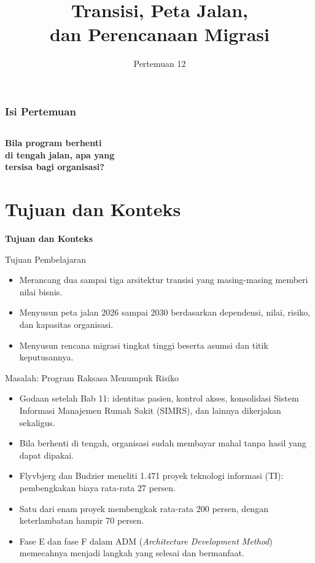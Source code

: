 \documentclass[aspectratio=169, table, 12pt]{beamer}
\title{\Huge Transisi, Peta Jalan,\\ \vspace{10pt} dan Perencanaan Migrasi}
\date{Pertemuan 12}
\begin{document}
\frame{\titlepage}

\begin{frame}
  \frametitle{Isi Pertemuan}
  \vspace{14pt}
  \begin{columns}[t]
    {\small\tableofcontents[sections={1-3}]}

    {\small\tableofcontents[sections={4-6}]}
  \end{columns}
\end{frame}

\begin{frame}{\hfill}
  \centering
  \Huge{\textbf{Bila program berhenti\\di tengah jalan, apa yang\\tersisa bagi organisasi?}}
\end{frame}

\section{Tujuan dan Konteks}

\begin{frame}{\hfill}
  \centering
  \Huge{\textbf{Tujuan dan Konteks}}
\end{frame}

\begin{frame}{{\Large Tujuan Pembelajaran}}
  \vspace{10pt}
  \begin{itemize}
    \item Merancang dua sampai tiga arsitektur transisi yang masing-masing memberi nilai bisnis.
    \item Menyusun peta jalan 2026 sampai 2030 berdasarkan dependensi, nilai, risiko, dan kapasitas
          organisasi.
    \item Menyusun rencana migrasi tingkat tinggi beserta asumsi dan titik keputusannya.
  \end{itemize}
\end{frame}

\begin{frame}{{\Large Masalah: Program Raksasa Menumpuk Risiko}}
  \small
  \vspace{4pt}
  \begin{itemize}
    \item Godaan setelah Bab 11: identitas pasien, kontrol akses, konsolidasi Sistem Informasi
          Manajemen Rumah Sakit (SIMRS), dan lainnya dikerjakan sekaligus.
    \item Bila berhenti di tengah, organisasi sudah membayar mahal tanpa hasil yang dapat dipakai.
    \item Flyvbjerg dan Budzier meneliti 1.471 proyek teknologi informasi (TI): pembengkakan biaya
          rata-rata 27 persen.
    \item Satu dari enam proyek membengkak rata-rata 200 persen, dengan keterlambatan hampir 70 persen.
    \item Fase E dan fase F dalam ADM (\textit{Architecture Development Method}) memecahnya menjadi
          langkah yang selesai dan bermanfaat.
  \end{itemize}
\end{frame}
\end{document}
